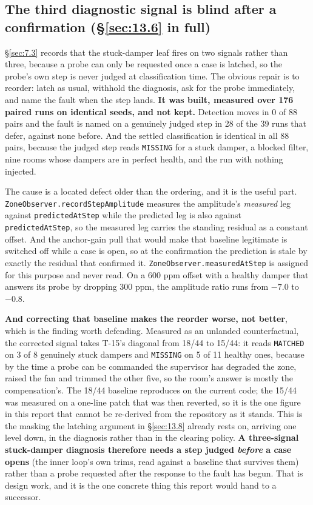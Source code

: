 \subsection{The third diagnostic signal is blind after a confirmation (\texorpdfstring{\S\ref{sec:13.6}}{13.6} in full)}\label{sec:I.5}


§\ref{sec:7.3} records that the stuck-damper leaf fires on two signals rather than three, because a probe can
only be requested once a case is latched, so the probe's own step is never judged at
classification time. The obvious repair is to reorder: latch as usual, withhold the diagnosis, ask for the probe immediately,
and name the fault when the step lands. \textbf{It was built, measured over 176 paired runs on
identical seeds, and not kept.} Detection moves in 0 of 88 pairs and the fault is named on a
genuinely judged step in 28 of the 39 runs that defer, against none before. And the settled
classification is identical in all 88 pairs, because the judged step reads \texttt{MISSING} for a
stuck damper, a blocked filter, nine rooms whose dampers are in perfect health, and the run with
nothing injected.

The cause is a located defect older than the ordering, and it is the useful part.
\texttt{ZoneObserver.\allowbreak recordStepAmplitude} measures the amplitude's \emph{measured} leg against
\texttt{predictedAtStep} while the predicted leg is also against \texttt{predictedAtStep}, so the
measured leg carries the standing residual as a constant offset. And the anchor-gain pull that
would make that baseline legitimate is switched off while a case is open, so at the confirmation the
prediction is stale by exactly the residual that confirmed it. \texttt{ZoneObserver.measuredAtStep}
is assigned for this purpose and never read. On a 600 ppm offset with a healthy damper that answers
its probe by dropping 300 ppm, the amplitude ratio runs from $-7.0$ to $-0.8$.

\textbf{And correcting that baseline makes the reorder worse, not better}, which is the finding worth
defending. Measured as an unlanded counterfactual, the corrected signal takes T-15's diagonal from
18/44 to 15/44: it reads \texttt{MATCHED} on 3 of 8 genuinely stuck dampers and \texttt{MISSING} on 5
of 11 healthy ones, because by the time a probe can be commanded the supervisor has degraded the
zone, raised the fan and trimmed the other five, so the room's answer is mostly the compensation's. The 18/44 baseline reproduces on the current code; the 15/44 was measured on a one-line patch that was then reverted, so it is the one figure in this report that cannot be re-derived from the repository as it stands.
This is the masking the latching argument in §\ref{sec:13.8} already rests on, arriving one level down, in the
diagnosis rather than in the clearing policy. \textbf{A three-signal stuck-damper diagnosis therefore
needs a step judged \emph{before} a case opens} (the inner loop's own trims, read against a
baseline that survives them) rather than a probe requested after the response to the fault has
begun. That is design work, and it is the one concrete thing this report would hand to a successor.

